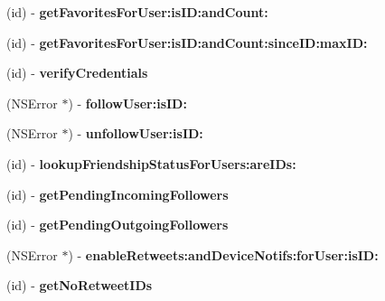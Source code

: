 \begin{DoxyCompactItemize}
(id) -\/ {\bfseries get\+Favorites\+For\+User\+:is\+I\+D\+:and\+Count\+:}
\item 
\mbox{\label{interfaceFHSTwitterEngine_a5cb2b3d5f37157fb14ad907d47e82b52}} 
(id) -\/ {\bfseries get\+Favorites\+For\+User\+:is\+I\+D\+:and\+Count\+:since\+I\+D\+:max\+I\+D\+:}
\item 
\mbox{\label{interfaceFHSTwitterEngine_a6e7eb3263c2e343b510dbe804cf31049}} 
(id) -\/ {\bfseries verify\+Credentials}
\item 
\mbox{\label{interfaceFHSTwitterEngine_a8467c9b37225c82399e97a01a00677db}} 
(N\+S\+Error $\ast$) -\/ {\bfseries follow\+User\+:is\+I\+D\+:}
\item 
\mbox{\label{interfaceFHSTwitterEngine_a54bad861bff202d22c7b885f3d02ee3f}} 
(N\+S\+Error $\ast$) -\/ {\bfseries unfollow\+User\+:is\+I\+D\+:}
\item 
\mbox{\label{interfaceFHSTwitterEngine_a8729080afca18ca2c1ad23dc63a699af}} 
(id) -\/ {\bfseries lookup\+Friendship\+Status\+For\+Users\+:are\+I\+Ds\+:}
\item 
\mbox{\label{interfaceFHSTwitterEngine_a7c9d9fd7f3f4ff678f263c178062387e}} 
(id) -\/ {\bfseries get\+Pending\+Incoming\+Followers}
\item 
\mbox{\label{interfaceFHSTwitterEngine_a854c69a975423a5fdf72084a19c98a2b}} 
(id) -\/ {\bfseries get\+Pending\+Outgoing\+Followers}
\item 
\mbox{\label{interfaceFHSTwitterEngine_a78ead374f51a8da200c6f35d9e539bbf}} 
(N\+S\+Error $\ast$) -\/ {\bfseries enable\+Retweets\+:and\+Device\+Notifs\+:for\+User\+:is\+I\+D\+:}
\item 
\mbox{\label{interfaceFHSTwitterEngine_a13b519e2e6562b166358344edb6f918f}} 
(id) -\/ {\bfseries get\+No\+Retweet\+I\+Ds}
\item 
\mbox{\label{interfaceFHSTwitterEngine_a1fd645657e5986209ac1adca38318b3b}} 

\end{DoxyCompactItemize}
